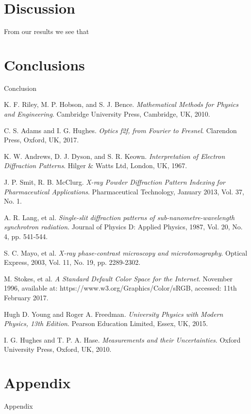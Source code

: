 \documentclass[twocolumn]{revtex4}
\begin{document}
\vspace{-3ex}
\section{Discussion}
\vspace{-2ex}
From our results we see that 


\vspace{-5ex}
\section{Conclusions}
\vspace{-2ex}

Conclusion

\begin{thebibliography}{5}
	K. F. Riley, M. P. Hobson, and S. J. Bence.
	\textit{Mathematical Methods for Physics and Engineering}.
	Cambridge University Press, Cambridge, UK, 2010.
	
	C. S. Adams and I. G. Hughes.
	\textit{Optics f2f, from Fourier to Fresnel}.
	Clarendon Press, Oxford, UK, 2017.

	K. W. Andrews, D. J. Dyson, and S. R. Keown.
	\textit{Interpretation of Electron Diffraction Patterns}.
	Hilger \& Watts Ltd, London, UK, 1967.
	
	J. P. Smit, R. B. McClurg.	
	\textit{X-ray Powder Diffraction Pattern Indexing for Pharmaceutical Applications}.
	Pharmaceutical Technology, January 2013, Vol. 37, No. 1.
	
	A. R. Lang, et al.
	\textit{Single-slit diffraction patterns of sub-nanometre-wavelength synchrotron radiation}.
	Journal of Physics D: Applied Physics, 1987, Vol. 20, No. 4, pp. 541-544.
	
	S. C. Mayo, et al.
	\textit{X-ray phase-contrast microscopy and microtomography}.
	Optical Express, 2003, Vol. 11, No. 19, pp. 2289-2302.
	
	M. Stokes, et al.
	\textit{A Standard Default Color Space for the Internet}.
	November 1996, available at: https://www.w3.org/Graphics/Color/sRGB, accessed: 11th February 2017. 

	Hugh D. Young and Roger A. Freedman.
	\textit{University Physics with Modern Physics, 13th Edition}. 
	Pearson Education Limited, Essex, UK, 2015.
	
	I. G. Hughes and T. P. A. Hase.
	\textit{Measurements and their Uncertainties}. 
	Oxford University Press, Oxford, UK, 2010.
	
\end{thebibliography}
\clearpage

\vfill
\twocolumngrid
\vspace{-3ex}
\section*{Appendix}
\vspace{-2ex}

Appendix


\clearpage
\end{document}
